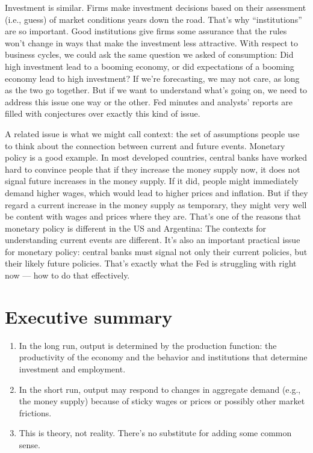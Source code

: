 Investment is similar.  Firms make investment decisions
based on their assessment (i.e., guess)
of market conditions years down the road.
That's why ``institutions'' are so important. Good institutions give firms some assurance that the rules won't change
in ways that make the investment less attractive.
With respect to business cycles, we could ask the same question
we asked of consumption: Did high investment lead to a booming economy,
or did expectations of a booming economy lead to high investment?
If we're forecasting, we may not care, as long as the two go
together.
But if we want to understand what's going on, we need to address
this issue one way or the other.
Fed minutes and analysts' reports
are filled with conjectures over exactly this kind of issue.

A related issue is what we might call context:
the set of assumptions people use to think about
the connection between current and future events.
Monetary policy is a good example.
In most developed countries,
central banks  have worked hard to convince people
that if they increase the money supply now,
it does not signal future increases in the money supply.
If it did, people might immediately demand higher wages,
which would lead to higher prices and inflation.
But if they regard a current increase in the money supply as temporary,
they might very well be content with wages and prices
where they are.
That's one of the reasons that monetary policy is different
in the US and Argentina:
The contexts for understanding current events are different.
It's also an important practical issue for monetary policy: central banks  must signal not only their current policies,
but their likely future policies.
That's exactly what the Fed is struggling with right now --- how to do that effectively.




\section*{Executive summary}

\begin{enumerate}
\item In the long run, output is determined by the production function:
the productivity of the economy and the behavior and institutions
that determine investment and employment.

\item In the short run, output may respond to changes in
aggregate demand (e.g., the money supply) because of sticky wages or prices
or possibly other market frictions.

\item This is theory, not reality.
There's no substitute for adding some common sense.
\end{enumerate}

